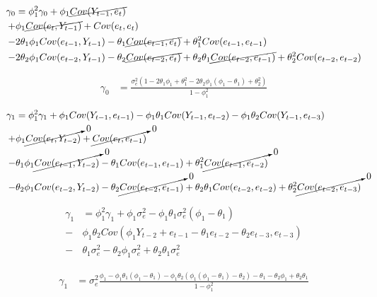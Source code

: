 \documentclass{article}
\begin{document}
\begin{align*}
   \gamma_0 &  = \phi_1^2 \gamma_0 + \phi_1 \cancel{Cov(Y_{t-1} , e_{t})} \\
   + & \phi_1 \cancel{Cov(e_t,Y_{t-1})} + Cov(e_t, e_{t})  \\
   - & 2\theta_1 \phi_1 Cov( e_{t-1} , Y_{t-1}) - \theta_1 \cancel{Cov(e_{t-1} , e_{t})}  + \theta_1^2 Cov(e_{t-1} , e_{t-1})  \\
   - & 2\theta_2\phi_1 Cov(e_{t-2}, Y_{t-1}) - \theta_2 \cancel{Cov(e_{t-2}, e_{t})} + \theta_2\theta_1 \cancel{Cov(e_{t-2}, e_{t-1})} + \theta_2^2 Cov(e_{t-2}, e_{t-2})
\end{align*}

\begin{align*}
   \gamma_0 &  = \frac{\sigma^2_e\left( 1 - 2\theta_1 \phi_1   + \theta_1^2 - 2\theta_2\phi_1 (\phi_1 - \theta_1)  + \theta_2^2 \right) }{1 - \phi_1^2 }
\end{align*}

\begin{align*}
   \gamma_1 &  = \phi_1^2 \gamma_1 + \phi_1 Cov(Y_{t-1} , e_{t-1}) - \phi_1\theta_1 Cov(Y_{t-1} ,e_{t-2}) -\phi_1 \theta_2 Cov(Y_{t-1}, e_{t-3}) \\
   + & \phi_1 \cancelto{0}{Cov(e_t,Y_{t-2})} + \cancelto{0}{Cov(e_t, e_{t-1})}  \\
   - & \theta_1 \phi_1 \cancelto{0}{Cov( e_{t-1} , Y_{t-2})} - \theta_1 Cov(e_{t-1} , e_{t-1})  + \theta_1^2 \cancelto{0}{Cov(e_{t-1} , e_{t-2})}  \\
   - & \theta_2\phi_1 Cov(e_{t-2}, Y_{t-2}) - \theta_2 \cancelto{0}{Cov(e_{t-2}, e_{t-1})} + \theta_2\theta_1 Cov(e_{t-2}, e_{t-2}) + \theta_2^2 \cancelto{0}{Cov(e_{t-2}, e_{t-3})}
\end{align*}

\begin{align*}
   \gamma_1 &  = \phi_1^2 \gamma_1 + \phi_1 \sigma^2_e - \phi_1\theta_1 \sigma^2_e(\phi_1 - \theta_1) \\
   - & \phi_1 \theta_2 Cov(\phi_1Y_{t-2} + e_{t-1} -\theta_1 e_{t-2} - \theta_2 e_{t-3}, e_{t-3}) \\
   - & \theta_1 \sigma^2_e - \theta_2\phi_1 \sigma^2_e + \theta_2\theta_1 \sigma^2_e
\end{align*}

\begin{align*}
   \gamma_1 &  = \sigma^2_e\frac{\phi_1 - \phi_1\theta_1(\phi_1 - \theta_1)
   - \phi_1 \theta_2 (\phi_1(\phi_1 - \theta_1) - \theta_2)
   - \theta_1 - \theta_2\phi_1 + \theta_2\theta_1}{1 - \phi_1^2}
\end{align*}
\end{document}
